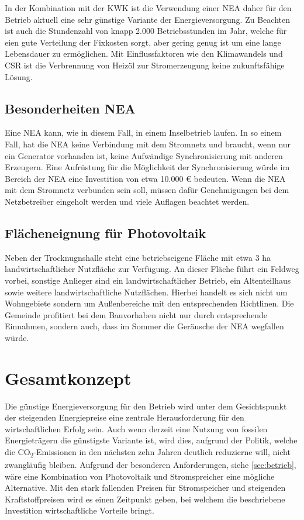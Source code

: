 \documentclass[11pt]{scrartcl}
\begin{document}
In der Kombination mit der \ac{KWK} ist die Verwendung einer \ac{NEA} daher für den Betrieb aktuell eine sehr günstige Variante der Energieversorgung.
Zu Beachten ist auch die Stundenzahl von knapp 2.000 Betriebsstunden im Jahr, welche für eien gute Verteilung der Fixkosten sorgt, aber gering genug ist um eine lange Lebensdauer zu ermöglichen.
Mit Einflussfaktoren wie den  Klimawandels und \ac{CSR} ist die Verbrennung von Heizöl zur Stromerzeugung keine zukunftsfähige Lösung.

\subsection{Besonderheiten NEA}
\label{subsec:NEA}
Eine \ac{NEA} kann, wie in diesem Fall, in einem Inselbetrieb laufen.
In so einem Fall, hat die \ac{NEA} keine Verbindung mit dem Stromnetz und braucht, wenn nur ein Generator vorhanden ist, keine Aufwändige Synchronisierung mit anderen Erzeugern.
Eine Aufrüstung für die Möglichkeit der Synchronisierung würde im Bereich der \ac{NEA} eine Investition von etwa 10.000 € bedeuten.
Wenn die \ac{NEA} mit dem Stromnetz verbunden sein soll, müssen dafür Genehmigungen bei dem Netzbetreiber eingeholt werden und viele Auflagen beachtet werden.


\subsection{Flächeneignung für Photovoltaik}
Neben der Trocknugnshalle steht eine betriebseigene Fläche mit etwa 3 ha landwirtschaftlicher Nutzfläche zur Verfügung.
An dieser Fläche führt ein Feldweg vorbei, sonstige Anlieger sind ein landwirtschaftlicher Betrieb, ein Altenteilhaus sowie weitere landwirtschaftliche Nutzflächen.
Hierbei handelt es sich nicht um Wohngebiete sondern um Außenbereiche mit den entsprechenden Richtlinen.
Die Gemeinde profitiert bei dem Bauvorhaben nicht nur durch entsprechende Einnahmen, sondern auch, dass im Sommer die Geräusche der \ac{NEA} wegfallen würde.



\section{Gesamtkonzept}
Die günstige Energieversorgung für den Betrieb wird unter dem Gesichtspunkt der steigenden Energiepreise eine zentrale Herausforderung für den wirtschaftlichen Erfolg sein.
Auch wenn derzeit eine Nutzung von fossilen Energieträgern die günstigste Variante ist, wird dies, aufgrund der Politik, welche die CO\textsubscript{2}-Emissionen in den nächsten zehn Jahren deutlich reduzierne will, nicht zwangläufig bleiben.
Aufgrund der besonderen Anforderungen, siehe \cref{sec:betrieb}, wäre eine Kombination von Photovoltaik und Stromspreicher eine mögliche Alternative.
Mit den stark fallenden Preisen für Stromspeicher  und steigenden Kraftstoffpreisen wird es einen Zeitpunkt geben, bei welchem die beschriebene Investition wirtschaftliche Vorteile bringt.
\end{document}
